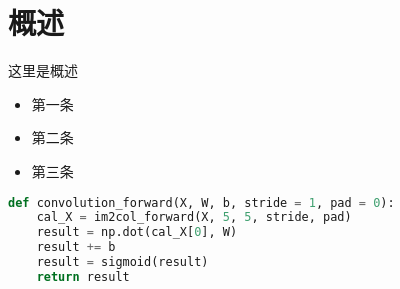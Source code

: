 \section{概述}

这里是概述

\begin{itemize}
	\item 第一条
	\item 第二条
	\item 第三条
\end{itemize}

\begin{lstlisting}[language=Python, caption={这里是代码标题}, label={code:a-label-to-be-refered-to}]
def convolution_forward(X, W, b, stride = 1, pad = 0):
    cal_X = im2col_forward(X, 5, 5, stride, pad)
    result = np.dot(cal_X[0], W)
    result += b
    result = sigmoid(result)
    return result
\end{lstlisting}